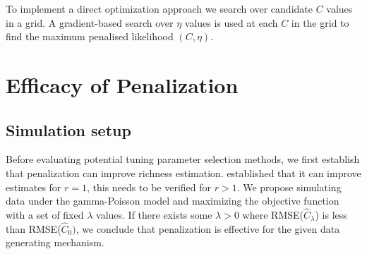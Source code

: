 \documentclass[oupdraft]{bio}
\begin{document}
To implement a direct optimization approach we search over candidate $C$ values in a grid.  A gradient-based search over $\eta$ values is used at each $C$ in the grid to find the maximum penalised likelihood  $(C, \eta)$.

\section{Efficacy of Penalization}
\label{sec:efficacy_sims}
\subsection{Simulation setup}

Before evaluating potential tuning parameter selection methods, we first establish that penalization can improve richness estimation.  \citet{wang_2005} established that it can improve estimates for $r = 1$, this needs to be verified for $r> 1$.
We propose simulating data under the gamma-Poisson model and maximizing the objective function with a set of fixed $\lambda$ values.  If there exists some $\lambda > 0$ where RMSE($\widehat{C}_{\lambda}$) is less than RMSE($\widehat{C}_0)$, we conclude that penalization is effective for the given data generating mechanism.
\end{document}
